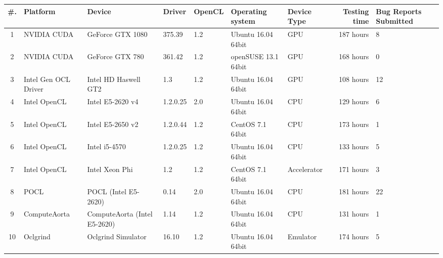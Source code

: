 \begin{tabular}{ cllllll | rR{1.4cm} }
\toprule
\textbf{\#. } & \textbf{Platform} & \textbf{Device} & \textbf{Driver} & \textbf{OpenCL} & 
\textbf{Operating system} & \textbf{Device Type} & \textbf{Testing time} & \textbf{Bug Reports Submitted} \\
 & NVIDIA CUDA & GeForce GTX 1080 & 375.39 & 1.2 & Ubuntu 16.04 64bit & GPU & 187 hours & 8 \\
2 & NVIDIA CUDA & GeForce GTX 780 & 361.42 & 1.2 & openSUSE  13.1 64bit & GPU & 168 hours & 0 \\
3 & Intel Gen OCL Driver & Intel HD Haswell GT2 & 1.3 & 1.2 & Ubuntu 16.04 64bit & GPU & 108 hours & 12 \\
4 & Intel OpenCL & Intel E5-2620 v4 & 1.2.0.25 & 2.0 & Ubuntu 16.04 64bit & CPU & 129 hours & 6 \\
5 & Intel OpenCL & Intel E5-2650 v2 & 1.2.0.44 & 1.2 & CentOS 7.1 64bit & CPU & 173 hours & 1 \\
6 & Intel OpenCL & Intel i5-4570 & 1.2.0.25 & 1.2 & Ubuntu 16.04 64bit & CPU & 133 hours & 5 \\
7 & Intel OpenCL & Intel Xeon Phi & 1.2 & 1.2 & CentOS 7.1 64bit & Accelerator & 171 hours & 3 \\
8 & POCL & POCL (Intel E5-2620) & 0.14 & 2.0 & Ubuntu 16.04 64bit & CPU & 181 hours & 22 \\
9 & ComputeAorta & ComputeAorta (Intel E5-2620) & 1.14 & 1.2 & Ubuntu 16.04 64bit & CPU & 131 hours & 1 \\
10 & Oclgrind & Oclgrind Simulator & 16.10 & 1.2 & Ubuntu 16.04 64bit & Emulator & 174 hours & 5 \\

\bottomrule
\end{tabular}

